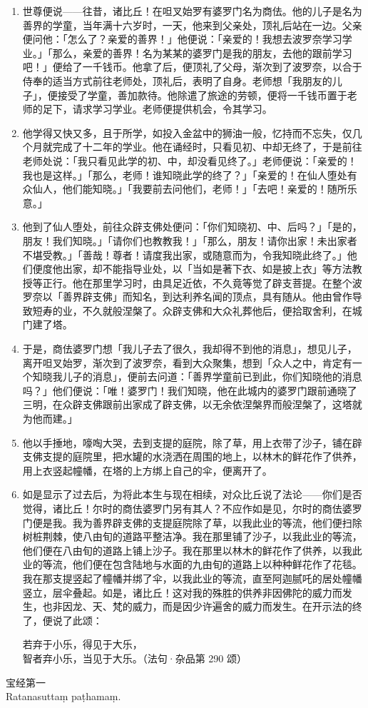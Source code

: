 \begin{enumerate}
\item 世尊便说——往昔，诸比丘！在呾叉始罗有婆罗门名为商佉。他的儿子是名为善界的学童，当年满十六岁时，一天，他来到父亲处，顶礼后站在一边。父亲便问他：「怎么了？亲爱的善界！」他便说：「亲爱的！我想去波罗奈学习学业。」「那么，亲爱的善界！名为某某的婆罗门是我的朋友，去他的跟前学习吧！」便给了一千钱币。他拿了后，便顶礼了父母，渐次到了波罗奈，以合于侍奉的适当方式前往老师处，顶礼后，表明了自身。老师想「我朋友的儿子」，便接受了学童，善加款待。他除遣了旅途的劳顿，便将一千钱币置于老师的足下，请求学习学业。老师便提供机会，令其学习。
\item 他学得又快又多，且于所学，如投入金盆中的狮油一般，忆持而不忘失，仅几个月就完成了十二年的学业。他在诵经时，只看见初、中却无终了，于是前往老师处说：「我只看见此学的初、中，却没看见终了。」老师便说：「亲爱的！我也是这样。」「那么，老师！谁知晓此学的终了？」「亲爱的！在仙人堕处有众仙人，他们能知晓。」「我要前去问他们，老师！」「去吧！亲爱的！随所乐意。」
\item 他到了仙人堕处，前往众辟支佛处便问：「你们知晓初、中、后吗？」「是的，朋友！我们知晓。」「请你们也教教我！」「那么，朋友！请你出家！未出家者不堪受教。」「善哉！尊者！请度我出家，或随意而为，令我知晓此终了。」他们便度他出家，却不能指导业处，以「当如是著下衣、如是披上衣」等方法教授等正行。他在那里学习时，由具足近依，不久竟等觉了辟支菩提。在整个波罗奈以「善界辟支佛」而知名，到达利养名闻的顶点，具有随从。他由曾作导致短寿的业，不久就般涅槃了。众辟支佛和大众礼葬他后，便拾取舍利，在城门建了塔。
\item 于是，商佉婆罗门想「我儿子去了很久，我却得不到他的消息」，想见儿子，离开呾叉始罗，渐次到了波罗奈，看到大众聚集，想到「众人之中，肯定有一个知晓我儿子的消息」，便前去问道：「善界学童前已到此，你们知晓他的消息吗？」他们便说：「唯！婆罗门！我们知晓，他在此城内的婆罗门跟前通晓了三明，在众辟支佛跟前出家成了辟支佛，以无余依涅槃界而般涅槃了，这塔就为他而建。」
\item 他以手捶地，嚎啕大哭，去到支提的庭院，除了草，用上衣带了沙子，铺在辟支佛支提的庭院里，把水罐的水浇洒在周围的地上，以林木的鲜花作了供养，用上衣竖起幢幡，在塔的上方绑上自己的伞，便离开了。
\item 如是显示了过去后，为将此本生与现在相续，对众比丘说了法论——你们是否觉得，诸比丘！尔时的商佉婆罗门另有其人？不应作如是见，尔时的商佉婆罗门便是我。我为善界辟支佛的支提庭院除了草，以我此业的等流，他们便扫除树桩荆棘，使八由旬的道路平整洁净。我在那里铺了沙子，以我此业的等流，他们便在八由旬的道路上铺上沙子。我在那里以林木的鲜花作了供养，以我此业的等流，他们便在包含陆地与水面的九由旬的道路上以种种鲜花作了花毯。我在那支提竖起了幢幡并绑了伞，以我此业的等流，直至阿迦腻吒的居处幢幡竖立，层伞叠起。如是，诸比丘！这对我的殊胜的供养非因佛陀的威力而发生，也非因龙、天、梵的威力，而是因少许遍舍的威力而发生。在开示法的终了，便说了此颂：\begin{quoting}若弃于小乐，得见于大乐，\\智者弃小乐，当见于大乐。（法句·杂品第 290 颂）\end{quoting}\end{enumerate}

\begin{center}\vspace{1em}宝经第一\\Ratanasuttaṃ paṭhamaṃ.\end{center}